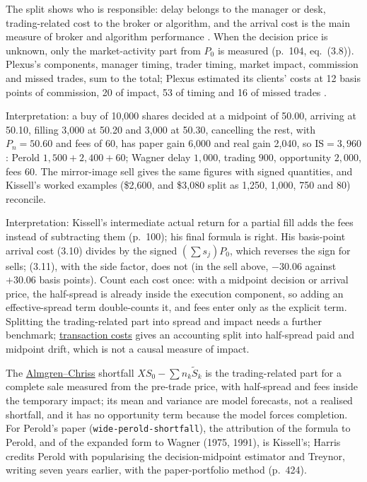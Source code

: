 \begin{qfdefinition}
 The split shows who is responsible: delay belongs to the manager or desk, trading-related cost to the broker or algorithm, and the arrival cost is the main measure of broker and algorithm performance \citep[chap.~3, pp.~101--104]{s7-kissellscience}. When the decision price is unknown, only the market-activity part from $P_0$ is measured (p.~104, eq.~(3.8)). Plexus's components, manager timing, trader timing, market impact, commission and missed trades, sum to the total; Plexus estimated its clients' costs at 12 basis points of commission, 20 of impact, 53 of timing and 16 of missed trades \citep[chap.~``Liquidity and Transaction Cost Measurement'', box, p.~437]{alpha-harris}.

Interpretation: a buy of 10{,}000 shares decided at a midpoint of 50.00, arriving at 50.10, filling 3{,}000 at 50.20 and 3{,}000 at 50.30, cancelling the rest, with $P_n=50.60$ and fees of 60, has paper gain 6{,}000 and real gain 2{,}040, so $\mathrm{IS}=3{,}960$: Perold $1{,}500+2{,}400+60$; Wagner delay $1{,}000$, trading $900$, opportunity $2{,}000$, fees $60$. The mirror-image sell gives the same figures with signed quantities, and Kissell's worked examples (\$2{,}600, and \$3{,}080 split as 1{,}250, 1{,}000, 750 and 80) reconcile.

 Interpretation: Kissell's intermediate actual return for a partial fill adds the fees instead of subtracting them (p.~100); his final formula is right. His basis-point arrival cost (3.10) divides by the signed $(\sum s_j)P_0$, which reverses the sign for sells; (3.11), with the side factor, does not (in the sell above, $-30.06$ against $+30.06$ basis points). Count each cost once: with a midpoint decision or arrival price, the half-spread is already inside the execution component, so adding an effective-spread term double-counts it, and fees enter only as the explicit term. Splitting the trading-related part into spread and impact needs a further benchmark; \hyperref[def:transaction-costs]{transaction costs} gives an accounting split into half-spread paid and midpoint drift, which is not a causal measure of impact.

The \hyperref[mod:almgren-chriss-execution]{Almgren--Chriss} shortfall $XS_0-\sum n_k\tilde S_k$ is the trading-related part for a complete sale measured from the pre-trade price, with half-spread and fees inside the temporary impact; its mean and variance are model forecasts, not a realised shortfall, and it has no opportunity term because the model forces completion. For Perold's paper (\nolinkurl{wide-perold-shortfall}), the attribution of the formula to Perold, and of the expanded form to Wagner (1975, 1991), is Kissell's; Harris credits Perold with popularising the decision-midpoint estimator and Treynor, writing seven years earlier, with the paper-portfolio method (p.~424).


\end{qfdefinition}
